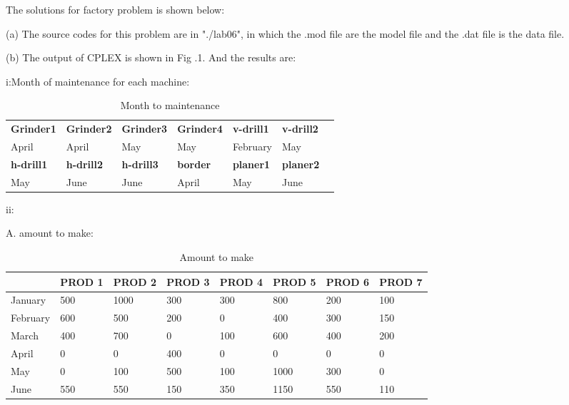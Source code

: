 \documentclass[12pt,a4paper]{article}
\makeatletter
\newtheorem*{solution}{Solution}
\theoremstyle{definition}
\renewenvironment{solution}[1][Solution] {\par\pushQED{\qed}\normalfont\topsep6\p@\@plus6\p@\relax\trivlist\item[\hskip\labelsep\bfseries#1\@addpunct{.}]\ignorespaces}{\popQED\endtrivlist\@endpefalse} \makeatother
\makeatother
\begin{document}
\begin{solution}
	The solutions for factory problem is shown below:

  (a) The source codes for this problem are in "./lab06", in which the .mod file are the model file and the .dat
  file is the data file.
   
  (b) The output of CPLEX is shown in {Fig .1}. And the results are:
  

     
  i:Month of maintenance for each machine:
  
   
  \begin{table}[htbp]
	\scriptsize
	\centering
	\renewcommand\arraystretch{1.1}
	\begin{tabular}{ m{}<{\centering} m{}<{\centering} m{}<{\centering} m{}<{\centering} m{}<{\centering} m{}<{\centering} m{}<{\centering}}
		\hline
		\textbf{Grinder1} & \textbf{Grinder2} & \textbf{Grinder3} & \textbf{Grinder4} & \textbf{v-drill1} &\textbf{v-drill2} \\
		    April   &  April  & May    &  May    &   February      &   May  \\
		\hline
		  \textbf{h-drill1} & \textbf{h-drill2}  & \textbf{h-drill3}  & \textbf{border}  & \textbf{planer1} & \textbf{planer2} \\
		    May   &  June  & June    &  April    &   May      &   June  \\
		\hline
	\end{tabular}
	\caption{Month to maintenance}
\end{table}

 

  ii:
  
  A. amount to make:

  \begin{table}[htbp]
	\scriptsize
	\centering
	\renewcommand\arraystretch{1.1}
	\begin{tabular}{m{} m{}<{\centering} m{}<{\centering} m{}<{\centering} m{}<{\centering} m{}<{\centering} m{}<{\centering} m{}<{\centering}}
		\hline
		& \textbf{PROD 1} & \textbf{PROD 2} & \textbf{PROD 3} & \textbf{PROD 4} & \textbf{PROD 5} & \textbf{PROD 6} &  \textbf{PROD 7} \\\hline
		January & 500 & 1000 & 300   & 300  & 800  & 200 & 100 \\
		February& 600 & 500 & 200   & 0    & 400   & 300 & 150 \\
		March & 400   & 700 & 0    & 100     & 600   & 400 & 200 \\
		April & 0   & 0    & 400   & 0   & 0      & 0   &  0\\
		May & 0       & 100 & 500   & 100   & 1000 & 300 & 0 \\
		June & 550   & 550 & 150    & 350   & 1150 & 550 & 110 \\
		\hline
	\end{tabular}
	\caption{Amount to make}
\end{table}


\end{solution}
\end{document}
